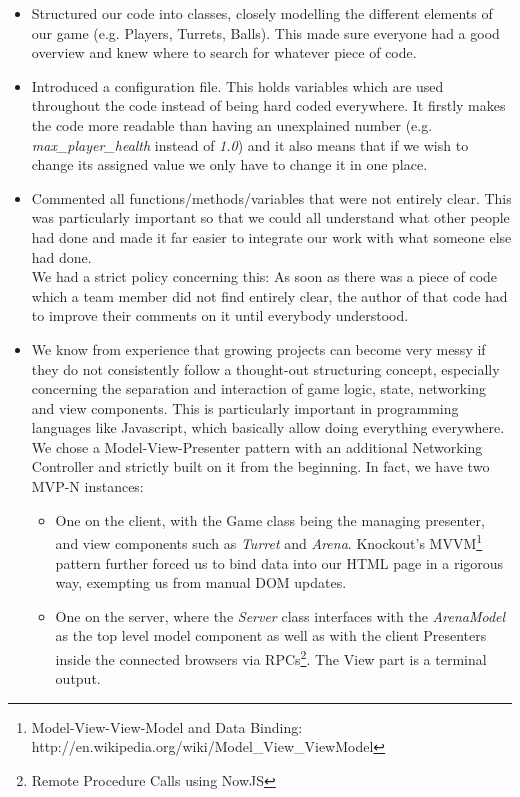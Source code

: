 \documentclass[a4wide, 11pt]{article}
\begin{document}
\begin{itemize}
\item
  Structured our code into classes, closely modelling the different elements of our game (e.g. Players, Turrets, Balls). This made sure everyone had a good overview and knew where to search for whatever piece of code.
\item
  Introduced a configuration file. This holds variables which are used throughout the code instead of being hard coded everywhere. It firstly makes the code more readable than having an unexplained number (e.g. \textit{max\_player\_health} instead of \textit{1.0}) and it also means that if we wish to change its assigned value we only have to change it in one place.
\item
  Commented all functions/methods/variables that were not entirely clear. This was particularly important so that we could all understand what other people had done and made it far easier to integrate our work with what someone else had done.
  \\
  We had a strict policy concerning this: As soon as there was a piece of code which a team member did not find entirely clear, the author of that code had to improve their comments on it until everybody understood.
\item
  We know from experience that growing projects can become very messy if they do not consistently follow a thought-out structuring concept, especially concerning the separation and interaction of game logic, state, networking and view components.
  This is particularly important in programming languages like Javascript, which basically allow doing everything everywhere.
  We chose a Model-View-Presenter pattern with an additional Networking Controller and strictly built on it from the beginning. In fact, we have two MVP-N instances:

  \begin{itemize}
  \item
    One on the client, with the Game class being the managing presenter, and view components such as \emph{Turret} and \emph{Arena}. Knockout's MVVM\footnote{Model-View-View-Model and Data Binding: http://en.wikipedia.org/wiki/Model\_View\_ViewModel} pattern further forced us to bind data into our HTML page in a rigorous way, exempting us from manual DOM updates.
  \item
    One on the server, where the \emph{Server} class interfaces with the \emph{ArenaModel} as the top level model component as well as with the client Presenters inside the connected browsers via RPCs\footnote{Remote Procedure Calls using NowJS}. The View part is a terminal output.
    

\end{itemize}
\end{itemize}
\end{document}
